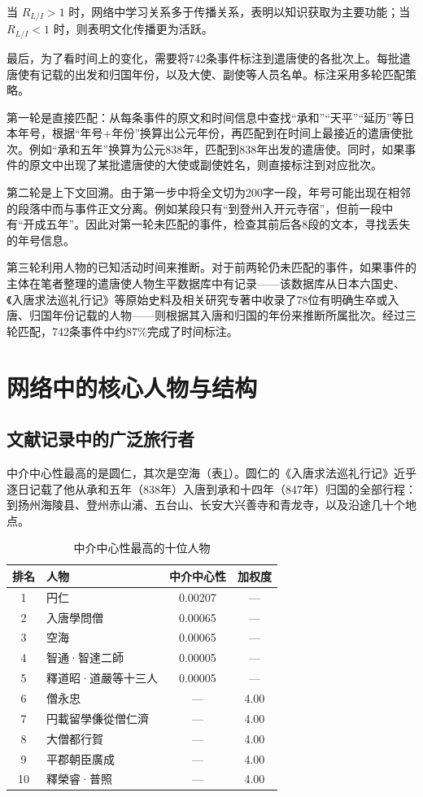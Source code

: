 \documentclass[12pt,a4paper]{article}
\begin{document}
当 $R_{L/I} > 1$ 时，网络中学习关系多于传播关系，表明以知识获取为主要功能；当 $R_{L/I} < 1$ 时，则表明文化传播更为活跃。

最后，为了看时间上的变化，需要将742条事件标注到遣唐使的各批次上。每批遣唐使有记载的出发和归国年份，以及大使、副使等人员名单。标注采用多轮匹配策略。

第一轮是直接匹配：从每条事件的原文和时间信息中查找“承和”“天平”“延历”等日本年号，根据“年号+年份”换算出公元年份，再匹配到在时间上最接近的遣唐使批次。例如“承和五年”换算为公元838年，匹配到838年出发的遣唐使。同时，如果事件的原文中出现了某批遣唐使的大使或副使姓名，则直接标注到对应批次。

第二轮是上下文回溯。由于第一步中将全文切为200字一段，年号可能出现在相邻的段落中而与事件正文分离。例如某段只有“到登州入开元寺宿”，但前一段中有“开成五年”。因此对第一轮未匹配的事件，检查其前后各8段的文本，寻找丢失的年号信息。

第三轮利用人物的已知活动时间来推断。对于前两轮仍未匹配的事件，如果事件的主体在笔者整理的遣唐使人物生平数据库中有记录——该数据库从日本六国史、《入唐求法巡礼行记》等原始史料及相关研究专著中收录了78位有明确生卒或入唐、归国年份记载的人物——则根据其入唐和归国的年份来推断所属批次。经过三轮匹配，742条事件中约87\%完成了时间标注。

\section{网络中的核心人物与结构}

\subsection{文献记录中的广泛旅行者}

中介中心性最高的是圆仁，其次是空海（表\ref{tab:centrality}）。圆仁的《入唐求法巡礼行记》近乎逐日记载了他从承和五年（838年）入唐到承和十四年（847年）归国的全部行程：到扬州海陵县、登州赤山浦、五台山、长安大兴善寺和青龙寺，以及沿途几十个地点。

\begin{table}[H]
\centering
\caption{中介中心性最高的十位人物}
\label{tab:centrality}
\begin{tabular}{clcc}
\toprule
\textbf{排名} & \textbf{人物} & \textbf{中介中心性} & \textbf{加权度} \\
\midrule
1 & 円仁 & 0.00207 & — \\
2 & 入唐學問僧 & 0.00065 & — \\
3 & 空海 & 0.00065 & — \\
4 & 智通·智達二師 & 0.00005 & — \\
5 & 釋道昭·道嚴等十三人 & 0.00005 & — \\
6 & 僧永忠 & — & 4.00 \\
7 & 円載留學傔從僧仁濟 & — & 4.00 \\
8 & 大僧都行賀 & — & 4.00 \\
9 & 平郡朝臣廣成 & — & 4.00 \\
10 & 釋榮睿·普照 & — & 4.00 \\
\bottomrule
\end{tabular}
\end{table}
\end{document}
